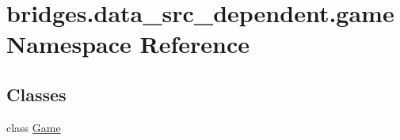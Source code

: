 \hypertarget{namespacebridges_1_1data__src__dependent_1_1game}{}\section{bridges.\+data\+\_\+src\+\_\+dependent.\+game Namespace Reference}
\label{namespacebridges_1_1data__src__dependent_1_1game}
\subsection*{Classes}
\begin{DoxyCompactItemize}
\item 
class \mbox{\hyperlink{classbridges_1_1data__src__dependent_1_1game_1_1_game}{Game}}
\end{DoxyCompactItemize}

